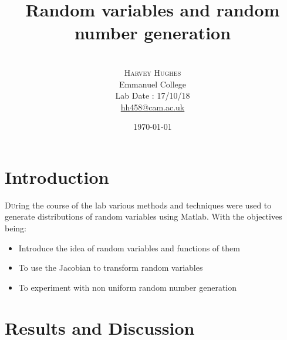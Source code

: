 \documentclass[twoside,twocolumn]{article}
\title{Random variables and random number generation } %
\author{%
\\
\textsc{Harvey Hughes} \\
\normalsize Emmanuel College \\ %
\normalsize Lab Date : 17/10/18\\
\normalsize \href{mailto:hh458@cam.ac.uk}{hh458@cam.ac.uk} %
}
\date{\today} %
\begin{document}
\maketitle


\section{Introduction}

\lettrine[nindent=0em,lines=3]{D}uring the course of the lab various methods and techniques were used to generate distributions of random variables using Matlab.
\newline
With the objectives being:
\begin{itemize}
\item Introduce the idea of random variables and functions of them\\
\item To use the Jacobian to transform random variables\\
\item To experiment with non uniform random number generation\\
\end{itemize}



\section{Results and Discussion}
\end{document}
